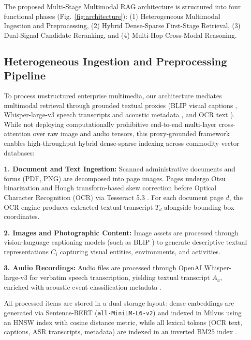 \documentclass[conference]{IEEEtran}
\begin{document}
The proposed Multi-Stage Multimodal RAG architecture is structured into four functional phases (Fig.~\ref{fig:architecture}): (1) Heterogeneous Multimodal Ingestion and Preprocessing, (2) Hybrid Dense-Sparse First-Stage Retrieval, (3) Dual-Signal Candidate Reranking, and (4) Multi-Hop Cross-Modal Reasoning.

\subsection{Heterogeneous Ingestion and Preprocessing Pipeline}
To process unstructured enterprise multimedia, our architecture mediates multimodal retrieval through grounded textual proxies (BLIP visual captions \cite{li2022blip}, Whisper-large-v3 speech transcripts and acoustic metadata \cite{radford2023whisper, piczak2015esc50}, and OCR text \cite{smith2007tesseract}). While not deploying computationally prohibitive end-to-end multi-layer cross-attention over raw image and audio tensors, this proxy-grounded framework enables high-throughput hybrid dense-sparse indexing across commodity vector databases:

\textbf{1. Document and Text Ingestion:} Scanned administrative documents and forms (PDF, PNG) are decomposed into page images. Pages undergo Otsu binarization \cite{otsu1979} and Hough transform-based skew correction \cite{hough1962, fateh2024ocr} before Optical Character Recognition (OCR) via Tesseract 5.3 \cite{smith2007tesseract}. For each document page $d$, the OCR engine produces extracted textual transcript $T_d$ alongside bounding-box coordinates.

\textbf{2. Images and Photographic Content:} Image assets are processed through vision-language captioning models (such as BLIP \cite{li2022blip}) to generate descriptive textual representations $C_i$ capturing visual entities, environments, and activities.

\textbf{3. Audio Recordings:} Audio files are processed through OpenAI Whisper-large-v3 \cite{radford2023whisper} for verbatim speech transcription, yielding textual transcript $A_a$, enriched with acoustic event classification metadata \cite{piczak2015esc50}.

All processed items are stored in a dual storage layout: dense embeddings are generated via Sentence-BERT (\texttt{all-MiniLM-L6-v2}) \cite{reimers2019sbert} and indexed in Milvus \cite{wang2021milvus} using an HNSW index \cite{malkov2020hnsw} with cosine distance metric, while all lexical tokens (OCR text, captions, ASR transcripts, metadata) are indexed in an inverted BM25 index \cite{robertson2009bm25}.
\end{document}
